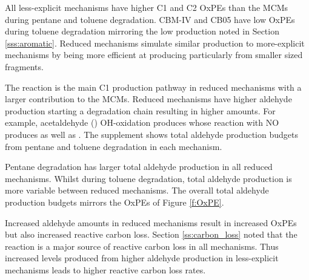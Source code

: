 All less-explicit mechanisms have higher C1 and C2 OxPEs than the MCMs during pentane and toluene degradation.
CBM-IV and CB05 have low OxPEs during toluene degradation mirroring the low  production noted in Section \ref{sss:aromatic}.
Reduced mechanisms simulate similar  production to more-explicit mechanisms by being more efficient at producing  particularly from smaller sized fragments.

The  reaction is the main C1  production pathway in reduced mechanisms with a larger contribution to the MCMs.
Reduced mechanisms have higher aldehyde production starting a degradation chain resulting in higher  amounts.
For example, acetaldehyde () OH-oxidation produces  whose reaction with NO produces  as well as .
The supplement shows total aldehyde production budgets from pentane and toluene degradation in each mechanism.  

Pentane degradation has larger total aldehyde production in all reduced mechanisms.
Whilst during toluene degradation, total aldehyde production is more variable between reduced mechanisms.
The overall total aldehyde production budgets mirrors the OxPEs of Figure \ref{f:OxPE}.

Increased aldehyde amounts in reduced mechanisms result in increased OxPEs but also increased reactive carbon loss.
Section \ref{ss:carbon_loss} noted that the  reaction is a major source of reactive carbon loss in all mechanisms. 
Thus increased  levels produced from higher aldehyde production in less-explicit mechanisms leads to higher reactive carbon loss rates.
